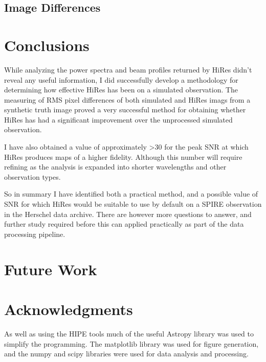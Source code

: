 \documentclass[a4paper]{article}
\numberwithin{equation}{section}
\begin{document}
\begin{multicols}{2}
\subsection{Image Differences}


\section{Conclusions}

While analyzing the power spectra and beam profiles returned by HiRes didn't reveal any useful information, I did successfully develop a methodology for determining how effective HiRes has been on a simulated observation. The measuring of RMS pixel differences of both simulated and HiRes imags from a synthetic truth image proved a very successful method for obtaining whether HiRes has had a significant improvement over the unprocessed simulated observation.

I have also obtained  a value of approximately \textgreater30 for the peak SNR at which HiRes produces maps of a higher fidelity. Although this number will require refining as the analysis is expanded into shorter wavelengths and other observation types.

So in summary I have identified both a practical method, and a possible value of SNR for which HiRes would be suitable to use by default on a SPIRE observation in the Herschel data archive. There are however more questions to answer, and further study required before this can applied practically as part of the data processing pipeline.

\section{Future Work}


\section{Acknowledgments}

As well as using the HIPE tools \citep{HIPE} much of the useful Astropy library \citep{robitaille2013astropy} was used to simplify the programming. The matplotlib library \citep{Hunter:2007} was used for figure generation, and the numpy and scipy libraries \citep{van2011numpy} were used for data analysis and processing.

\end{multicols}



\break
\appendix
{}


\end{document}
